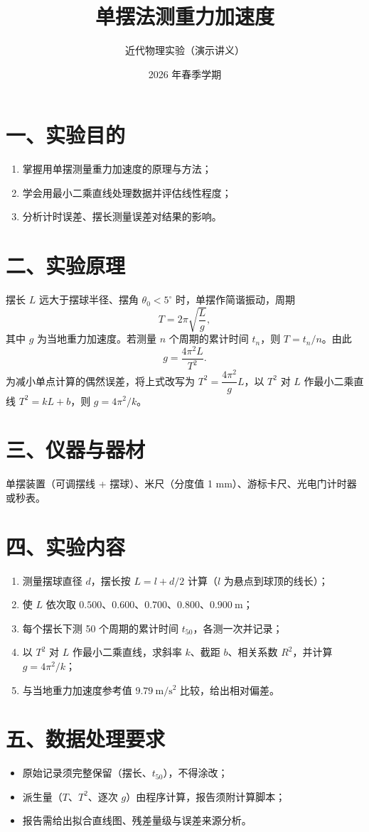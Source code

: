 \documentclass[11pt]{ctexart}
\title{单摆法测重力加速度}
\author{近代物理实验（演示讲义）}
\date{2026 年春季学期}
\begin{document}
\maketitle

\section*{一、实验目的}
\begin{enumerate}
  \item 掌握用单摆测量重力加速度的原理与方法；
  \item 学会用最小二乘直线处理数据并评估线性程度；
  \item 分析计时误差、摆长测量误差对结果的影响。
\end{enumerate}

\section*{二、实验原理}
摆长 $L$ 远大于摆球半径、摆角 $\theta_0<5^\circ$ 时，单摆作简谐振动，周期
\begin{equation}
  T=2\pi\sqrt{\frac{L}{g}},
\end{equation}
其中 $g$ 为当地重力加速度。若测量 $n$ 个周期的累计时间 $t_n$，则 $T=t_n/n$。由此
\begin{equation}
  g=\frac{4\pi^{2}L}{T^{2}} .
\end{equation}
为减小单点计算的偶然误差，将上式改写为 $T^{2}=\dfrac{4\pi^{2}}{g}L$，以 $T^{2}$ 对 $L$ 作最小二乘直线 $T^{2}=kL+b$，则 $g=4\pi^{2}/k$。

\section*{三、仪器与器材}
单摆装置（可调摆线 + 摆球）、米尺（分度值 1 mm）、游标卡尺、光电门计时器或秒表。

\section*{四、实验内容}
\begin{enumerate}
  \item 测量摆球直径 $d$，摆长按 $L=l+d/2$ 计算（$l$ 为悬点到球顶的线长）；
  \item 使 $L$ 依次取 $0.500$、$0.600$、$0.700$、$0.800$、$0.900\ \mathrm{m}$；
  \item 每个摆长下测 50 个周期的累计时间 $t_{50}$，各测一次并记录；
  \item 以 $T^{2}$ 对 $L$ 作最小二乘直线，求斜率 $k$、截距 $b$、相关系数 $R^2$，并计算 $g=4\pi^{2}/k$；
  \item 与当地重力加速度参考值 $9.79\ \mathrm{m/s^2}$ 比较，给出相对偏差。
\end{enumerate}

\section*{五、数据处理要求}
\begin{itemize}
  \item 原始记录须完整保留（摆长、$t_{50}$），不得涂改；
  \item 派生量（$T$、$T^{2}$、逐次 $g$）由程序计算，报告须附计算脚本；
  \item 报告需给出拟合直线图、残差量级与误差来源分析。
\end{itemize}
\end{document}
